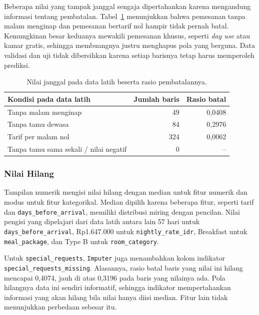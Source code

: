 Beberapa nilai yang tampak janggal sengaja dipertahankan karena mengandung informasi tentang pembatalan. Tabel~\ref{tab:nilai-janggal} menunjukkan bahwa pemesanan tanpa malam menginap dan pemesanan bertarif nol hampir tidak pernah batal. Kemungkinan besar keduanya mewakili pemesanan khusus, seperti \textit{day use} atau kamar gratis, sehingga membuangnya justru menghapus pola yang berguna. Data validasi dan uji tidak dibersihkan karena setiap barisnya tetap harus memperoleh prediksi.

\begin{table}[htbp]
    \centering
    \small
    \begin{tabular}{@{}l r r@{}}
        \toprule
        Kondisi pada data latih & Jumlah baris & Rasio batal \\
        \midrule
        Tanpa malam menginap & 49 & 0,0408 \\
        Tanpa tamu dewasa & 84 & 0,2976 \\
        Tarif per malam nol & 324 & 0,0062 \\
        Tanpa tamu sama sekali / nilai negatif & 0 & -- \\
        \bottomrule
    \end{tabular}
    \caption{Nilai janggal pada data latih beserta rasio pembatalannya.}
    \label{tab:nilai-janggal}
\end{table}

\subsubsection{Nilai Hilang}
Tampilan numerik mengisi nilai hilang dengan median untuk fitur numerik dan modus untuk fitur kategorikal. Median dipilih karena beberapa fitur, seperti tarif dan \texttt{days\_before\_arrival}, memiliki distribusi miring dengan pencilan. Nilai pengisi yang dipelajari dari data latih antara lain 57 hari untuk \texttt{days\_before\_arrival}, Rp1.647.000 untuk \texttt{nightly\_rate\_idr}, Breakfast untuk \texttt{meal\_package}, dan Type B untuk \texttt{room\_category}.

Untuk \texttt{special\_requests}, \texttt{Imputer} juga menambahkan kolom indikator \texttt{special\_requests\_missing}. Alasannya, rasio batal baris yang nilai ini hilang mencapai 0,4074, jauh di atas 0,3196 pada baris yang nilainya ada. Pola hilangnya data ini sendiri informatif, sehingga indikator mempertahankan informasi yang akan hilang bila nilai hanya diisi median. Fitur lain tidak menunjukkan perbedaan sebesar itu.

